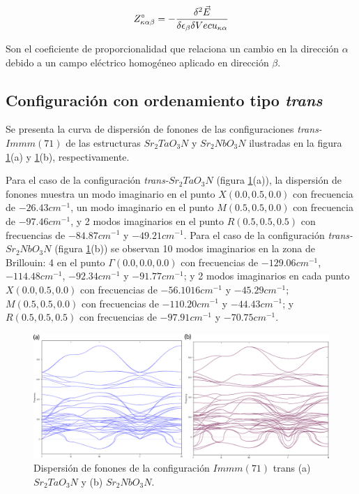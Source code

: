 \begin{equation}
    Z^{\circ}_{\kappa\alpha\beta}=-\frac{\delta^{2}\Vec{E}}{\delta\epsilon_{\beta}\delta\\Vec{u}_{\kappa\alpha}}
    \label{Eq. Born}
\end{equation}

Son el coeficiente de proporcionalidad que relaciona un cambio en la dirección $\alpha$ debido a un campo eléctrico homogéneo aplicado en dirección $\beta$.

\subsection{Configuración con ordenamiento tipo \emph{trans}}

Se presenta la curva de dispersión de fonones de las configuraciones \emph{trans-}$Immm(71)$ de las estructuras $Sr_{2}TaO_{3}N$ y $Sr_{2}NbO_{3}N$ ilustradas en la figura \ref{trans-phon}(a) y \ref{trans-phon}(b), respectivamente.

Para el caso de la configuración \emph{trans-}$Sr_{2}TaO_{3}N$ (figura \ref{trans-phon}(a)), la dispersión de fonones muestra un modo imaginario en el punto $X(0.0,0.5,0.0)$ con frecuencia de $-26.43cm^{-1}$, un modo imaginario en el punto $M(0.5,0.5,0.0)$ con frecuencia de $-97.46cm^{-1}$, y 2 modos imaginarios en el punto $R(0.5,0.5,0.5)$ con frecuencias de $-84.87cm^{-1}$ y $-49.21cm^{-1}$. Para el caso de la configuración \emph{trans-}$Sr_{2}NbO_{3}N$ (figura \ref{trans-phon}(b)) se observan 10 modos imaginarios en la zona de Brillouin: 4 en el punto $\Gamma(0.0,0.0,0.0)$ con frecuencias de $-129.06cm^{-1}$, $-114.48cm^{-1}$, $-92.34cm^{-1}$ y $-91.77cm^{-1}$; y 2 modos imaginarios en cada punto $X(0.0,0.5,0.0)$ con frecuencias de $-56.1016cm^{-1}$ y $-45.29cm^{-1}$; $M(0.5,0.5,0.0)$ con frecuencias de $-110.20cm^{-1}$ y $-44.43cm^{-1}$; y $R(0.5,0.5,0.5)$ con frecuencias de $-97.91cm^{-1}$ y $-70.75cm^{-1}$.

\begin{figure}[h!]
    \centering
    \includegraphics[width=\textwidth]{Figs/dphon-both_trans.png}
    \caption{Dispersión de fonones de la configuración $Immm(71)$ trans (a) $Sr_{2}TaO_{3}N$ y (b) $Sr_{2}NbO_{3}N$.}
    \label{trans-phon}
\end{figure}

